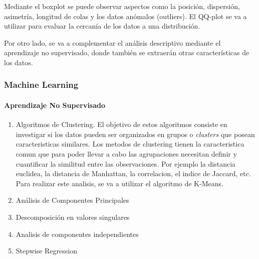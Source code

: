Mediante el boxplot se puede observar aspectos como la posición, dispersión, asimetría, longitud de colas y los datos anómalos (outliers). 
El QQ-plot se va a utilizar para evaluar la cercanía de los datos a una distribución. \cite{Orellana2001}

Por otro lado, se va a complementar el análisis descriptivo mediante el aprendizaje no supervisado, donde también se extraerán otras características de los datos.






\subsubsection{Machine Learning}
\paragraph {Aprendizaje No Supervisado}
\begin{enumerate}
\item Algoritmos de Clustering. El objetivo de estos algoritmos consiste en investigar si los datos pueden ser organizados en grupos o \textit{clusters} que posean caracteristicas similares. %
Los metodos de clustering tienen la caracteristica comun que para poder llevar a cabo las agrupaciones necesitan definir y cuantificar la similitud entre las observaciones. Por ejemplo la distancia euclidea, la distancia de Manhattan, la correlacion, el indice de Jaccard, etc. %
Para realizar este analisis, se va a utilizar el algoritmo de K-Means. %
\item Análisis de Componentes Principales
\item Descomposición en valores singulares
\item Analisis de componentes independientes
\item Stepwise Regression
\end{enumerate}

